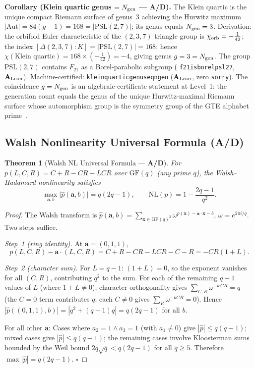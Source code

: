 \documentclass[11pt]{article}
\newtheorem{theorem}{Theorem}[section]
\theoremstyle{remark}
\newcommand{\GF}[1]{\ensuremath{\mathrm{GF}(#1)}}
\newcommand{\lean}[1]{%
  \penalty-100
  \begingroup\def\_{\textunderscore\allowbreak}\texttt{#1}\endgroup}
\newcommand{\CatAL}{\texorpdfstring{\ensuremath{\textbf{A}_{\rm Lean}}}{A-Lean}}
\newcommand{\CatAD}{\textbf{A/D}}
\begin{document}
\medskip
\noindent\textbf{Corollary (Klein quartic genus $= N_{\rm gen}$ --- \CatAD{}).}
The Klein quartic is the unique compact Riemann surface of genus~$3$
achieving the Hurwitz maximum $|\mathrm{Aut}| = 84(g-1) = 168 =
|\mathrm{PSL}(2,7)|$; its genus equals $N_{\rm gen} = 3$.  Derivation: the
orbifold Euler characteristic of the $(2,3,7)$ triangle group is
$\chi_{\rm orb} = -\tfrac{1}{42}$; the index
$[\Delta(2,3,7){:}K] = |\mathrm{PSL}(2,7)| = 168$; hence
$\chi(\text{Klein quartic}) = 168 \times (-\tfrac{1}{42}) = -4$, giving
genus $g = 3 = N_{\rm gen}$.  The group $\mathrm{PSL}(2,7)$ contains
$F_{21}$ as a Borel-parabolic subgroup
(\lean{f21\_is\_borel\_psl27}, \CatAL{}).
Machine-certified: \lean{klein\_quartic\_genus\_eq\_n\_gen}
(\CatAL{}, zero \texttt{sorry}).  The coincidence $g = N_{\rm gen}$ is an
algebraic-certificate statement at Level~1: the generation count equals the
genus of the unique Hurwitz-maximal Riemann surface whose automorphism group
is the symmetry group of the GTE alphabet prime~\cite{SpivackPSL27Unification}.

\subsection{Walsh Nonlinearity Universal Formula (\CatAD{})}
\label{subsec:walsh-nl}

\begin{theorem}[Walsh NL Universal Formula --- \CatAD{}]
\label{thm:walshNL}
For $p(L,C,R) = C+R-CR-LCR$ over $\GF{q}$ (any prime $q$), the Walsh--Hadamard
nonlinearity satisfies
\[
  \max_{\mathbf{a},b}\bigl|\widehat{p}(\mathbf{a},b)\bigr| = q(2q-1),
  \qquad
  \mathrm{NL}(p) = 1 - \frac{2q-1}{q^2}.
\]
\end{theorem}

\begin{proof}
The Walsh transform is $\widehat{p}(\mathbf{a},b) = \sum_{\mathbf{x}\in\GF{q}^3}
\omega^{p(\mathbf{x})-\mathbf{a}\cdot\mathbf{x}-b}$, $\omega = e^{2\pi i/q}$.
Two steps suffice.

\emph{Step~1 (ring identity).} At $\mathbf{a} = (0,1,1)$,
\[
  p(L,C,R) - \mathbf{a}\cdot(L,C,R) = C+R-CR-LCR - C - R = -CR(1+L).
\]

\emph{Step~2 (character sum).} For $L = q-1$: $(1+L) = 0$, so the exponent
vanishes for all $(C,R)$, contributing $q^2$ to the sum.
For each of the remaining $q-1$ values of $L$ (where $1+L \ne 0$), character
orthogonality gives $\sum_{C,R}\omega^{-k\,CR} = q$ (the $C = 0$ term contributes $q$;
each $C \ne 0$ gives $\sum_R \omega^{-kCR} = 0$).
Hence $|\widehat{p}((0,1,1),b)| = |q^2 + (q-1)q| = q(2q-1)$ for all $b$.

For all other $\mathbf{a}$: Cases where $a_2 = 1 \wedge a_3 = 1$ (with $a_1 \ne 0$)
give $|\widehat{p}| \le q(q-1)$; mixed cases give $|\widehat{p}| \le q(q-1)$; the
remaining cases involve Kloosterman sums bounded by the Weil bound $2q\sqrt{q} < q(2q-1)$
for all $q \ge 5$.
Therefore $\max|\widehat{p}| = q(2q-1)$. $\square$
\end{proof}
\end{document}

